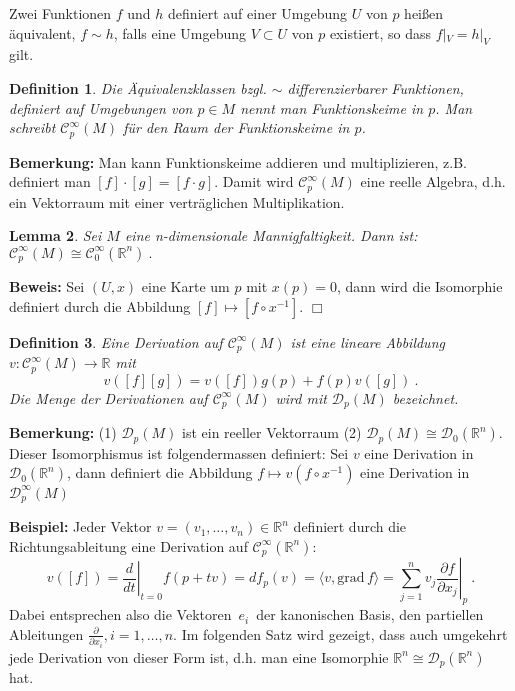\documentclass[12pt,a4paper]{article}
\def\R{\mathbb{R}}
\def\grad{\mathrm{grad}\,}
\def\la{\langle}
\def\ra{\rangle}
\newtheorem{Lemma}{Lemma}[section]
\newtheorem{Definition}[Lemma]{Definition}
\def\proof{\noindent\textbf{Beweis:}\quad}
\def\qed{\quad\hfill\ensuremath{\Box}}
\begin{document}
\bigskip

Zwei Funktionen $f$ und $h$ definiert auf einer Umgebung $U$ von $p$ hei\ss en \"aquivalent, $f\sim h$, falls eine
Umgebung $V\subset U$ von $p$ existiert, so dass $f|_V = h|_V$ gilt.

\begin{Definition} Die \"Aquivalenzklassen bzgl. $\sim$ differenzierbarer Funktionen, definiert  auf Umgebungen von
$p\in M$ nennt man {\em Funktionskeime} in $p$. Man schreibt $\mathcal C^\infty_p(M)$ f\"ur den Raum der
Funktionskeime in $p$.
\end{Definition}

\medskip

{\bf Bemerkung:} Man kann Funktionskeime addieren und multiplizieren, z.B. definiert man $[f]\cdot [g] =[f\cdot g]$.
Damit wird $\mathcal C^\infty_p(M)$ eine
reelle Algebra, d.h. ein Vektorraum mit einer vertr\"aglichen Multiplikation.

\bigskip

\begin{Lemma}
Sei $M$ eine n-dimensionale Mannigfaltigkeit. Dann ist:
$
\mathcal C^\infty_p(M) \cong \mathcal C^\infty_0(\R^n) \ .
$
\end{Lemma}
\proof
Sei $(U,x)$ eine Karte um $p$ mit $x(p)=0$, dann wird die Isomorphie definiert durch die Abbildung
$[f]\mapsto [f\circ x^{-1}]$.
\qed

\bigskip

\begin{Definition} Eine {\em Derivation} auf $\mathcal C^\infty_p(M)$ ist eine lineare Abbildung
$v:\mathcal C^\infty_p(M)\rightarrow \R$ mit
$$
v([f][g])= v([f])g(p) + f(p)v([g]) \ .
$$
Die Menge der Derivationen auf $\mathcal C^\infty_p(M)$ wird mit $\mathcal D_p(M)$
bezeichnet.
\end{Definition}

\bigskip

{\bf Bemerkung:} (1) $\mathcal D_p(M)$ ist ein reeller Vektorraum
(2) $\mathcal D_p(M)\cong \mathcal D_0(\R^n)$. Dieser Isomorphismus ist
folgendermassen definiert: Sei $v$ eine
Derivation in $\mathcal D_0(\R^n)$, dann definiert die Abbildung
$f\mapsto v(f\circ x^{-1})$ eine Derivation in $\mathcal D^\infty_p(M)$

\medskip

{\bf Beispiel:}
Jeder Vektor $v=(v_1,\ldots, v_n)\in \R^n$ definiert durch die Richtungsableitung eine
Derivation auf $\mathcal C^\infty_p(\R^n)$:
$$
v([f]) = \left.\frac{d}{dt}\right|_{t=0}f(p+tv) =df_p(v) = \la v, \grad f \ra = \sum^n_{j=1}
v_j \left.\frac{\partial f}{\partial x_j}\right|_p \ .
$$
Dabei entsprechen also
die Vektoren $\,e_i\,$ der kanonischen Basis, den partiellen
Ableitungen $\frac{\partial }{\partial x_i}, i=1,\ldots, n$. Im folgenden Satz wird gezeigt,
dass auch umgekehrt jede Derivation von dieser Form ist, d.h. man eine Isomorphie
$\R^n\cong \mathcal D_p(\R^n)$ hat.
\end{document}
